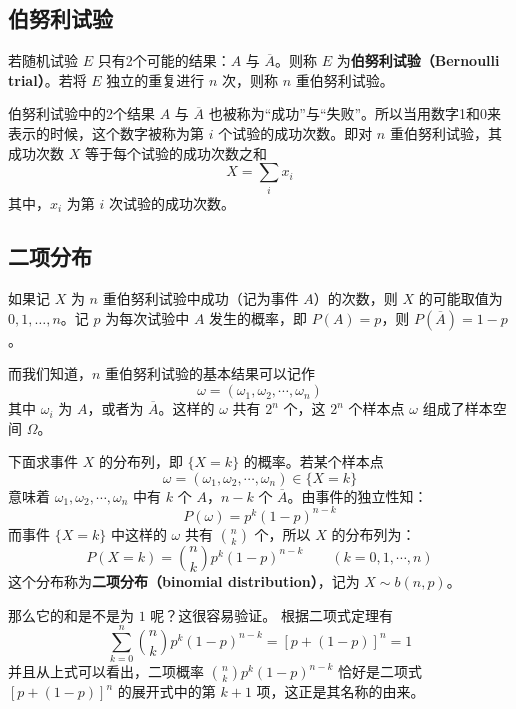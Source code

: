 
\subsection{伯努利试验}
\begin{definition}{}
若随机试验 $E$ 只有2个可能的结果：$A$ 与 $\overline{A}$。则称 $E$ 为\textbf{伯努利试验（Bernoulli trial）}。若将 $E$ 独立的重复进行 $n$ 次，则称 $n$ 重伯努利试验。
\end{definition}
伯努利试验中的2个结果 $A$ 与 $\overline{A}$ 也被称为“成功”与“失败”。所以当用数字1和0来表示的时候，这个数字被称为第 $i$ 个试验的成功次数。即对 $n$ 重伯努利试验，其成功次数 $X$ 等于每个试验的成功次数之和
\begin{equation}
X=\sum_i x_i
\end{equation}
其中，$x_i$ 为第 $i$ 次试验的成功次数。
\subsection{二项分布}
如果记 $X $ 为 $n $ 重伯努利试验中成功（记为事件 $A$）的次数，则 $X $ 的可能取值为 $0,1,\dots,n$。记 $p $ 为每次试验中 $A $ 发生的概率，即 $P(A)=p$，则 $P(\overline{A})=1-p$。

而我们知道，$n$ 重伯努利试验的基本结果可以记作
\begin{equation}
\omega=\left(\omega_{1}, \omega_{2}, \cdots, \omega_{n}\right)
\end{equation}
其中 $\omega_i$ 为 $A$，或者为 $\overline{A}$。这样的 $\omega$ 共有 $2^n$ 个，这 $2^n$ 个样本点 $\omega$ 组成了样本空间 $\Omega$。

下面求事件 $X$ 的分布列，即 $\{X=k\}$ 的概率。若某个样本点
\begin{equation}
\omega=\left(\omega_{1}, \omega_{2}, \cdots, \omega_{n}\right) \in\{X=k\}
\end{equation}
意味着 $\omega_1,\omega_2,\cdots,\omega_n$ 中有 $k$ 个 $A$，$n-k$ 个 $\overline A$。由事件的独立性知：
\begin{equation}
P(\omega)=p^{k}(1-p)^{n-k}
\end{equation}
而事件 $\{X=k\}$ 中这样的 $\omega$ 共有 $\binom nk$ 个，所以 $X$ 的分布列为：
\begin{equation}
P(X=k)=\binom nk p^{k}(1-p)^{n-k} \qquad (k=0,1, \cdots, n)
\end{equation}
这个分布称为\textbf{二项分布（binomial distribution）}，记为 $X\sim b(n, p)$。

那么它的和是不是为 $1$ 呢？这很容易验证。 根据二项式定理有
\begin{equation}
\sum_{k=0}^{n}\binom nk p^{k}(1-p)^{n-k}=[p+(1-p)]^{n}=1
\end{equation}
并且从上式可以看出，二项概率 $\binom nk p^{k}(1-p)^{n-k}$ 恰好是二项式 $[p+(1-p)]^{n}$ 的展开式中的第 $k+1$ 项，这正是其名称的由来。

